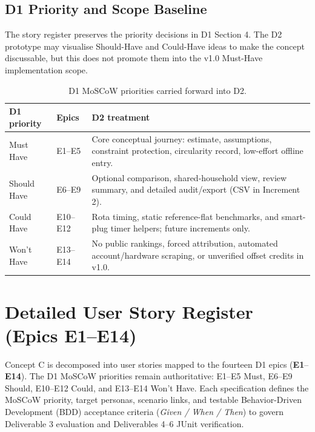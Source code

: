 \documentclass[12pt, a4paper]{article}
\begin{document}
\subsection{D1 Priority and Scope Baseline}
The story register preserves the priority decisions in D1 Section 4. The D2 prototype may visualise Should-Have and Could-Have ideas to make the concept discussable, but this does not promote them into the v1.0 Must-Have implementation scope.

\begin{table}[H]
\centering
\small
\begin{tabularx}{\textwidth}{@{}l l X@{}}
\toprule
\textbf{D1 priority} & \textbf{Epics} & \textbf{D2 treatment} \\
\midrule
Must Have & E1--E5 & Core conceptual journey: estimate, assumptions, constraint protection, circularity record, low-effort offline entry. \\
Should Have & E6--E9 & Optional comparison, shared-household view, review summary, and detailed audit/export (CSV in Increment 2). \\
Could Have & E10--E12 & Rota timing, static reference-flat benchmarks, and smart-plug timer helpers; future increments only. \\
Won't Have & E13--E14 & No public rankings, forced attribution, automated account/hardware scraping, or unverified offset credits in v1.0. \\
\bottomrule
\end{tabularx}
\caption{D1 MoSCoW priorities carried forward into D2.}
\label{tab:priority-trace}
\end{table}

\section{Detailed User Story Register (Epics E1--E14)}
Concept C is decomposed into user stories mapped to the fourteen D1 epics (\textbf{E1}--\textbf{E14}). The D1 MoSCoW priorities remain authoritative: E1--E5 Must, E6--E9 Should, E10--E12 Could, and E13--E14 Won't Have. Each specification defines the MoSCoW priority, target personas, scenario links, and testable Behavior-Driven Development (BDD) acceptance criteria (\textit{Given / When / Then}) to govern Deliverable 3 evaluation and Deliverables 4--6 JUnit verification.
\end{document}
